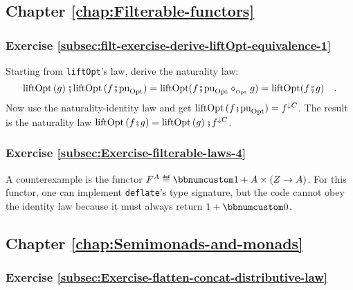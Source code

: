 \subsection*{Chapter \ref{chap:Filterable-functors}}

\subsubsection*{Exercise \ref{subsec:filt-exercise-derive-liftOpt-equivalence-1}}

Starting from \lstinline!liftOpt!\textsf{'}s law, derive the naturality law:
\[
\text{liftOpt}\left(g\right)\bef\text{liftOpt}\,(f\bef\text{pu}_{\text{Opt}})=\text{liftOpt}(f\bef\text{pu}_{\text{Opt}}\diamond_{_{\text{Opt}}}g)=\text{liftOpt}(f\bef g)\quad.
\]
Now use the naturality-identity law and get $\text{liftOpt}\,(f\bef\text{pu}_{\text{Opt}})=f^{\downarrow C}$.
The result is the naturality law $\text{liftOpt}\left(f\bef g\right)=\text{liftOpt}\left(g\right)\bef f^{\downarrow C}$.

\subsubsection*{Exercise \ref{subsec:Exercise-filterable-laws-4}}

A counterexample is the functor $F^{A}\triangleq\bbnum 1+A\times\left(Z\rightarrow A\right)$.
For this functor, one can implement \lstinline!deflate!\textsf{'}s type signature,
but the code cannot obey the identity law because it must always return
$1+\bbnum 0$.

\subsection*{Chapter \ref{chap:Semimonads-and-monads}}

\subsubsection*{Exercise \ref{subsec:Exercise-flatten-concat-distributive-law}}

